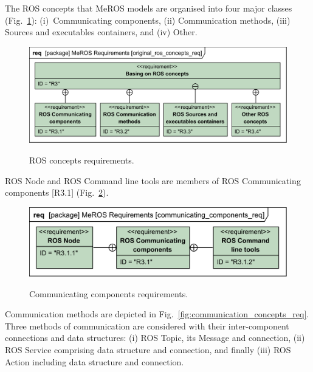 \documentclass[11pt,oneside,a4paper]{report}
\begin{document}
		
	The ROS concepts that MeROS models are organised into four major classes (Fig.~\ref{fig:ros_concepts_req}): (i)~Communicating components, (ii) Communication methods, (iii) Sources and executables containers, and (iv) Other.
	

	\begin{figure}[H]
		\centering
		\begin{center}
			{\includegraphics[scale=1.0]{diagrams/original_ros_concepts_req.png}}
		\end{center}
		\caption{ROS concepts requirements.} 
		\label{fig:ros_concepts_req}
	\end{figure}

	\pagebreak
	
	 ROS Node and ROS Command line tools are members of ROS Communicating components [R3.1]  (Fig.~\ref{fig:communicating_components_req}).

	\begin{figure}[H]
		\centering
		\begin{center}
			{\includegraphics[scale=1.0]{diagrams/communicating_components_req.png}}
		\end{center}
		\caption{Communicating components requirements.} 
		\label{fig:communicating_components_req}
	\end{figure}
	
	Communication methods are depicted in Fig.~\ref{fig:communication_concepts_req}.
	 Three methods of communication are considered with their inter-component connections and data structures: (i) ROS Topic, its Message and connection, (ii) ROS Service comprising data structure and connection, and finally (iii) ROS Action including data structure and connection.
	
\end{document}
